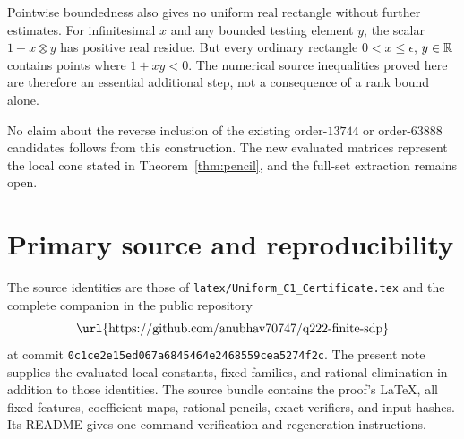 Pointwise boundedness also gives no uniform real rectangle without
further estimates. For infinitesimal $x$ and any bounded testing
element $y$, the scalar $1+x\otimes y$ has positive real residue.
But every ordinary rectangle $0<x\le\epsilon$, $y\in\mathbb R$ contains
points where $1+xy<0$. The numerical source inequalities proved
here are therefore an essential additional step, not a
consequence of a rank bound alone.

No claim about the reverse inclusion of the existing order-$13744$
or order-$63888$ candidates follows from this construction. The
new evaluated matrices represent the local cone stated in
Theorem~\ref{thm:pencil}, and the full-set extraction remains open.

\section*{Primary source and reproducibility}
The source identities are those of
\texttt{latex/Uniform\_C1\_Certificate.tex} and the complete
companion in the public repository
\[
 \text{\url{https://github.com/anubhav70747/q222-finite-sdp}}
\]
at commit
\texttt{0c1ce2e15ed067a6845464e2468559cea5274f2c}.
The present note supplies the evaluated local constants, fixed
families, and rational elimination in addition to those identities.
The source bundle contains the proof's \LaTeX, all fixed features,
coefficient maps, rational pencils, exact verifiers, and input
hashes. Its README gives one-command verification and regeneration
instructions.

